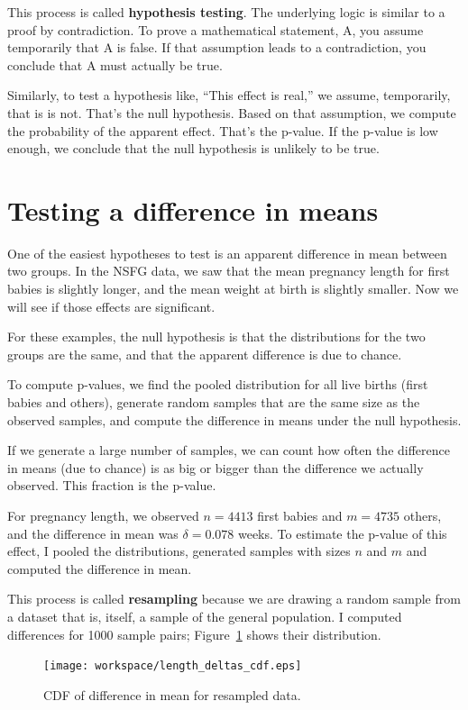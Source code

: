\documentclass[12pt]{book}
\begin{document}
This process is called {\bf hypothesis testing}.  The underlying
logic is similar to a proof by contradiction.  To prove a mathematical
statement, A, you assume temporarily that A is false.  If that
assumption leads to a contradiction, you conclude that A must actually
be true.

Similarly, to test a hypothesis like, ``This effect is real,'' we
assume, temporarily, that is is not.  That's the null hypothesis.
Based on that assumption, we compute the probability of the apparent
effect.  That's the p-value.  If the p-value is low enough, we
conclude that the null hypothesis is unlikely to be true.


\section{Testing a difference in means}

One of the easiest hypotheses to test is an apparent difference in mean
between two groups.  In the NSFG data, we saw that the mean pregnancy
length for first babies is slightly longer, and the mean weight at
birth is slightly smaller.  Now we will see if those effects are
significant.

For these examples, the null hypothesis is that the distributions
for the two groups are the same, and that the apparent difference is
due to chance.

To compute p-values, we find the pooled distribution for all live
births (first babies and others), generate random samples that are
the same size as the observed samples, and compute the difference
in means under the null hypothesis.

If we generate a large number of samples, we can count how often the
difference in means (due to chance) is as big or bigger than the
difference we actually observed.  This fraction is the p-value.

For pregnancy length, we observed $n=4413$ first babies and $m=4735$
others, and the difference in mean was $\delta=0.078$ weeks.  To estimate
the p-value of this effect, I pooled the distributions, generated
samples with sizes $n$ and $m$ and computed the difference in mean.

This process is called {\bf resampling} because we are drawing a
random sample from a dataset that is, itself, a sample of the general
population.  I computed differences for 1000 sample pairs;
Figure~\ref{length_deltas_cdf} shows their distribution.

\begin{figure}
\centerline{\texttt{[image: workspace/length\_deltas\_cdf.eps]}}
\caption{CDF of difference in mean for resampled data.}
\label{length_deltas_cdf}
\end{figure}
\end{document}
